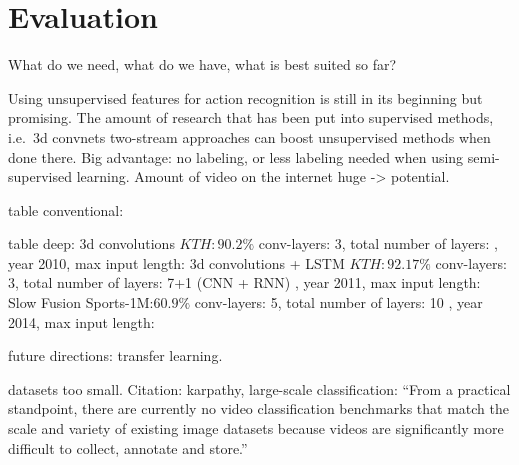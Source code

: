 \section{Evaluation}
What do we need, what do we have, what is best suited so far?

Using unsupervised features for action recognition is still in its beginning but promising.
The amount of research that has been put into supervised methods, i.e.\ 3d convnets two-stream approaches can boost unsupervised methods when done there.
Big advantage: no labeling, or less labeling needed when using semi-supervised learning.
Amount of video on the internet huge -> potential.

table conventional:

table deep:
3d convolutions \cite{ji_3d_2013}  $KTH:90.2\%$ conv-layers: 3, total number of layers: , year 2010, max input length:
3d convolutions + LSTM \cite{baccouche_sequential_2011} $KTH:92.17\%$ conv-layers: 3, total number of layers: 7+1 (CNN + RNN) , year 2011, max input length:
Slow Fusion \cite{karpathy_large-scale_2014} Sports-1M:$60.9\%$ conv-layers: 5, total number of layers: 10 , year 2014, max input length: 


future directions: transfer learning.

datasets too small. Citation: karpathy, large-scale classification: ``From a practical standpoint, there are currently no video classification benchmarks that match the scale and variety of existing image datasets because videos are significantly more difficult to collect, annotate and store.''
